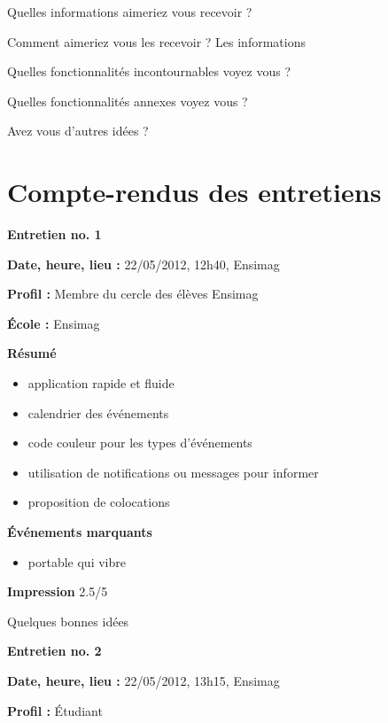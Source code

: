 \documentclass[a4paper, 11px]{article}
\begin{document}
Quelles informations aimeriez vous recevoir ?


Comment aimeriez vous les recevoir ?
Les informations


Quelles fonctionnalités incontournables voyez vous ?


Quelles fonctionnalités annexes voyez vous ?


Avez vous d'autres idées ?

\newpage

\section{Compte-rendus des entretiens}
\label{entretiens}


 \textbf {\large Entretien no. 1}

\textbf{Date, heure, lieu : }
22/05/2012, 12h40, Ensimag

\textbf{Profil : }
Membre du cercle des élèves Ensimag

\textbf{École : }
Ensimag

\textbf{Résumé}

	\begin{itemize}
		\item application rapide et fluide
		\item calendrier des événements
		\item code couleur pour les types d'événements
		\item utilisation de notifications ou messages pour informer
		\item proposition de colocations
	\end{itemize}

\vspace{.25cm}
\textbf{Événements marquants}	
	\begin{itemize}
		\item portable qui vibre
	\end{itemize}

\vspace{.25cm}
\textbf{Impression} 2.5/5 

Quelques bonnes idées



\vspace{.3cm}

 \textbf {\large Entretien no. 2}

\textbf{Date, heure, lieu : }
22/05/2012, 13h15, Ensimag

\textbf{Profil : }
Étudiant
\end{document}
